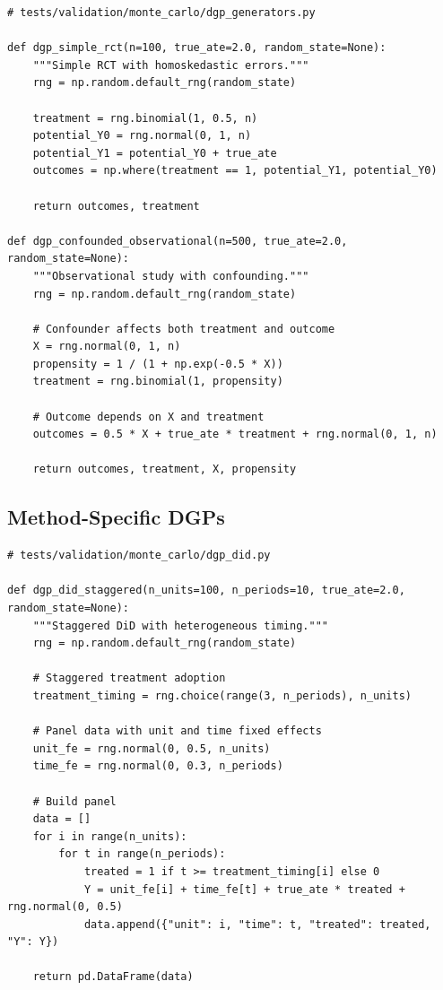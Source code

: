\begin{verbatim}
# tests/validation/monte_carlo/dgp_generators.py

def dgp_simple_rct(n=100, true_ate=2.0, random_state=None):
    """Simple RCT with homoskedastic errors."""
    rng = np.random.default_rng(random_state)

    treatment = rng.binomial(1, 0.5, n)
    potential_Y0 = rng.normal(0, 1, n)
    potential_Y1 = potential_Y0 + true_ate
    outcomes = np.where(treatment == 1, potential_Y1, potential_Y0)

    return outcomes, treatment

def dgp_confounded_observational(n=500, true_ate=2.0, random_state=None):
    """Observational study with confounding."""
    rng = np.random.default_rng(random_state)

    # Confounder affects both treatment and outcome
    X = rng.normal(0, 1, n)
    propensity = 1 / (1 + np.exp(-0.5 * X))
    treatment = rng.binomial(1, propensity)

    # Outcome depends on X and treatment
    outcomes = 0.5 * X + true_ate * treatment + rng.normal(0, 1, n)

    return outcomes, treatment, X, propensity
\end{verbatim}

\subsection{Method-Specific DGPs}

\begin{verbatim}
# tests/validation/monte_carlo/dgp_did.py

def dgp_did_staggered(n_units=100, n_periods=10, true_ate=2.0, random_state=None):
    """Staggered DiD with heterogeneous timing."""
    rng = np.random.default_rng(random_state)

    # Staggered treatment adoption
    treatment_timing = rng.choice(range(3, n_periods), n_units)

    # Panel data with unit and time fixed effects
    unit_fe = rng.normal(0, 0.5, n_units)
    time_fe = rng.normal(0, 0.3, n_periods)

    # Build panel
    data = []
    for i in range(n_units):
        for t in range(n_periods):
            treated = 1 if t >= treatment_timing[i] else 0
            Y = unit_fe[i] + time_fe[t] + true_ate * treated + rng.normal(0, 0.5)
            data.append({"unit": i, "time": t, "treated": treated, "Y": Y})

    return pd.DataFrame(data)
\end{verbatim}


